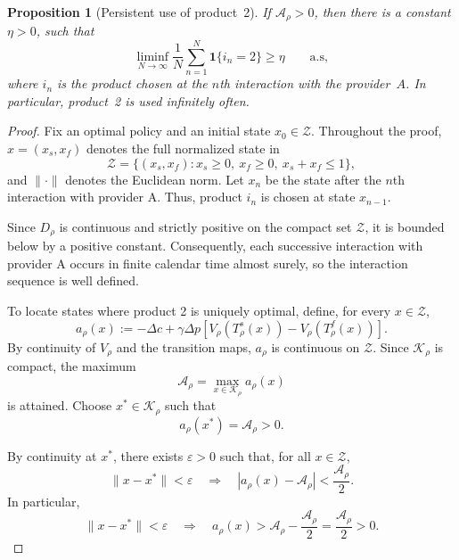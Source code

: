 \documentclass[11pt]{article}
\newcommand{\Ind}[1]{\mathbf 1\{#1\}}
\newtheorem{proposition}{Proposition}
\begin{document}
\begin{proposition}[Persistent use of product~2]
\label{prop:persistence}
If $\mathcal A_\rho>0$, then there is a constant
$\eta>0$, such that
\begin{equation}
\liminf_{N\to\infty}\frac1N\sum_{n=1}^{N}\Ind{i_n=2}\geq\eta
\qquad\text{a.s},
\end{equation}
where $i_n$ is the product chosen at the $n$th interaction with the provider~$A$.
In particular, product~2 is used infinitely often.
\end{proposition}

\begin{proof}
Fix an optimal policy and an initial state $x_0\in\mathcal Z$.
Throughout the proof, $x=(x_s,x_f)$ denotes the full normalized
state in
\begin{equation*}
\mathcal Z=\{(x_s,x_f):x_s\ge0,\ x_f\ge0,\ x_s+x_f\le1\},
\end{equation*}
and $\|\cdot\|$ denotes the Euclidean norm.
Let $x_n$ be the state after the $n$th interaction with provider A.
Thus, product $i_n$ is chosen at state $x_{n-1}$.

Since $D_\rho$ is continuous and strictly positive on the compact
set $\mathcal Z$, it is bounded below by a positive constant.
Consequently, each successive interaction with provider A occurs
in finite calendar time almost surely, so the interaction sequence
is well defined.

To locate states where product 2 is uniquely optimal, define,
for every $x\in\mathcal Z$,
\begin{equation*}
a_\rho(x)
:=-\Delta c+\gamma\Delta p
\left[
V_\rho(T_\rho^s(x))-V_\rho(T_\rho^f(x))
\right].
\end{equation*}
By continuity of $V_\rho$ and the transition maps,
$a_\rho$ is continuous on $\mathcal Z$.
Since $\mathcal K_\rho$ is compact, the maximum
\begin{equation*}
\mathcal A_\rho
=\max_{x\in\mathcal K_\rho}a_\rho(x)
\end{equation*}
is attained. Choose $x^*\in\mathcal K_\rho$ such that
\begin{equation*}
a_\rho(x^*)=\mathcal A_\rho>0.
\end{equation*}

By continuity at $x^*$, there exists $\varepsilon>0$ such that,
for all $x\in\mathcal Z$,
\begin{equation*}
\|x-x^*\|<\varepsilon
\quad\Longrightarrow\quad
|a_\rho(x)-\mathcal A_\rho|
<\frac{\mathcal A_\rho}{2}.
\end{equation*}
In particular,
\begin{equation}
\label{eq:pers-neighborhood}
\|x-x^*\|<\varepsilon
\quad\Longrightarrow\quad
a_\rho(x)>
\mathcal A_\rho-\frac{\mathcal A_\rho}{2}
=\frac{\mathcal A_\rho}{2}>0.
\end{equation}


\end{proof}
\end{document}
